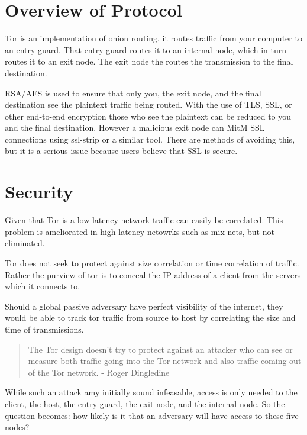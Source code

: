 \section{Overview of Protocol}
Tor is an implementation of onion routing, it routes traffic from your computer
to an entry guard. That entry guard routes it to an internal node, which in turn
routes it to an exit node. The exit node the routes the transmission to the
final destination.

RSA/AES is used to ensure that only you, the exit node, and the final
destination see the plaintext traffic being routed. With the use of TLS, SSL, or
other end-to-end encryption those who see the plaintext can be reduced to you
and the final destination. However a malicious exit node can MitM SSL connections
using ssl-strip or a similar tool. There are methods of avoiding this, but it is
a serious issue because users believe that SSL is secure.

\section{Security}
Given that Tor is a low-latency network traffic can easily be correlated. This
problem is ameliorated in high-latency netowrks such as mix nets, but not
eliminated.

Tor does not seek to protect against size correlation or time correlation of
traffic. Rather the purview of tor is to conceal the IP address of a client from
the servers which it connects to.

Should a global passive adversary have perfect visibility of the internet, they
would be able to track tor traffic from source to host by correlating the size
and time of transmissions.

\begin{quote}
The Tor design doesn't try to protect against an attacker who can see or measure
both traffic going into the Tor network and also traffic coming out of the Tor
network\cite{torOneCell}. - Roger Dingledine
\end{quote}

While such an attack amy initially sound infeasable, access is only needed to
the client, the host, the entry guard, the exit node, and the internal node.
So the question becomes: how likely is it that an adversary will have access to
these five nodes?

